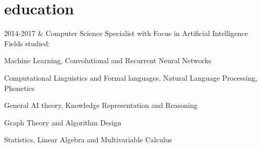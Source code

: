 \documentclass[]{cv-roald}
\begin{document}
\section*{education}
\begin{tabularcv}
    2014-2017   &   
                    \newline Computer Science Specialist with Focus in Artificial Intelligence
                    \newline Fields studied:
                    \begin{tabitemize}
                        \item Machine Learning, Convolutional and Recurrent Neural Networks
                        \item Computational Linguistics and Formal languages, Natural Language Processing, Phonetics
                        \item General AI theory, Knowledge Representation and Reasoning
                        \item Graph Theory and Algorithm Design
                        \item Statistics, Linear Algebra and Multivariable Calculus\newline
                    \end{tabitemize}
                    \\[\vspacepar] %


\end{tabularcv}
\end{document}
